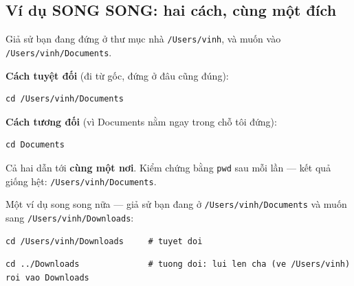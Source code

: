 \documentclass[12pt,a4paper]{article}
\begin{document}
\subsection{Ví dụ SONG SONG: hai cách, cùng một đích}

Giả sử bạn đang đứng ở thư mục nhà \texttt{/Users/vinh}, và muốn vào \texttt{/Users/vinh/Documents}.

\textbf{Cách tuyệt đối} (đi từ gốc, đứng ở đâu cũng đúng):
\begin{codebox}
\begin{verbatim}
cd /Users/vinh/Documents
\end{verbatim}
\end{codebox}

\textbf{Cách tương đối} (vì Documents nằm ngay trong chỗ tôi đứng):
\begin{codebox}
\begin{verbatim}
cd Documents
\end{verbatim}
\end{codebox}

Cả hai dẫn tới \textbf{cùng một nơi}. Kiểm chứng bằng \texttt{pwd} sau mỗi lần --- kết quả giống hệt: \texttt{/Users/vinh/Documents}.

Một ví dụ song song nữa --- giả sử bạn đang ở \texttt{/Users/vinh/Documents} và muốn sang \texttt{/Users/vinh/Downloads}:

\begin{codebox}
\begin{verbatim}
cd /Users/vinh/Downloads     # tuyet doi
\end{verbatim}
\end{codebox}
\begin{codebox}
\begin{verbatim}
cd ../Downloads              # tuong doi: lui len cha (ve /Users/vinh) roi vao Downloads
\end{verbatim}
\end{codebox}
\end{document}
